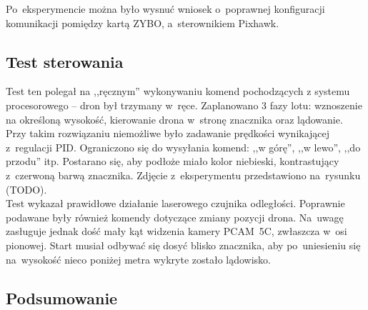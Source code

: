 Po~eksperymencie można było wysnuć wniosek o~poprawnej konfiguracji komunikacji pomiędzy kartą ZYBO, a~sterownikiem Pixhawk.

\subsection{Test sterowania}
\label{sec:test_sterowania}

Test ten polegał na ,,ręcznym'' wykonywaniu komend pochodzących z systemu procesorowego -- dron był trzymany w~ręce. 
Zaplanowano 3 fazy lotu: wznoszenie na określoną wysokość, kierowanie drona w~stronę znacznika oraz lądowanie.
Przy takim rozwiązaniu niemożliwe było zadawanie prędkości wynikającej z~regulacji PID. 
Ograniczono się do wysyłania komend: ,,w górę'', ,,w lewo'', ,,do przodu'' itp. 
Postarano się, aby podłoże miało kolor niebieski, kontrastujący z~czerwoną barwą znacznika. 
Zdjęcie z~eksperymentu przedstawiono na~rysunku (TODO).\\

Test wykazał prawidłowe działanie laserowego czujnika odległości. 
Poprawnie podawane były również komendy dotyczące zmiany pozycji drona. 
Na~uwagę zasługuje jednak dość mały kąt widzenia kamery PCAM~5C, zwłaszcza w~osi pionowej. 
Start musiał odbywać się dosyć blisko znacznika, aby po~uniesieniu się na~wysokość nieco poniżej metra wykryte zostało lądowisko.

\subsection{Podsumowanie}


